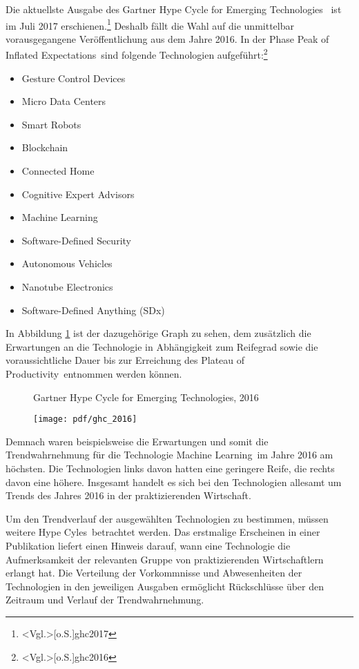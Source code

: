 Die aktuellste Ausgabe des \glqq Gartner Hype Cycle for Emerging Technologies\grqq~ ist im Juli 2017 erschienen.\footnote{\citeNP<Vgl.>[o.S.]{ghc2017}} Deshalb fällt die Wahl auf die unmittelbar vorausgegangene Veröffentlichung aus dem Jahre 2016. In der Phase \glqq Peak of Inflated Expecta\-tions\grqq~sind folgende Technologien aufgeführt:\footnote{\citeNP<Vgl.>[o.S.]{ghc2016}}

\begin{itemize}
	\item Gesture Control Devices
	\item Micro Data Centers
	\item Smart Robots
	\item Blockchain
	\item Connected Home
	\item Cognitive Expert Advisors
	\item Machine Learning
	\item Software-Defined Security
	\item Autonomous Vehicles
	\item Nanotube Electronics
	\item Software-Defined Anything (SDx)
\end{itemize}

In Abbildung \ref{fig:ghc2016} ist der dazugehörige Graph zu sehen, dem zusätzlich die Erwartungen an die Technologie in Abhängigkeit zum Reifegrad sowie die voraussichtliche Dauer bis zur Erreichung des \glqq Plateau of Productivity\grqq~entnommen werden können.

\begin{figure}
	\centering
	\caption{Gartner Hype Cycle for Emerging Technologies, 2016}
	\texttt{[image: pdf/ghc\_2016]}
	\caption*{\protect\citeNP<Quelle:>[o.S.]{ghcet2016}}
	\label{fig:ghc2016}
\end{figure}

Demnach waren beispielsweise die Erwartungen und somit die Trendwahrnehmung für die Technologie \glqq Machine Learning\grqq~im Jahre 2016 am höchsten. Die Technologien links davon hatten eine geringere Reife, die rechts davon eine höhere. Insgesamt handelt es sich bei den Technologien allesamt um Trends des Jahres 2016 in der praktizierenden Wirtschaft.

Um den Trendverlauf der ausgewählten Technologien zu bestimmen, müssen weitere \glqq Hype Cyles\grqq~betrachtet werden. Das erstmalige Erscheinen in einer Publikation liefert einen Hinweis darauf, wann eine Technologie die Aufmerksamkeit der relevanten Gruppe von praktizierenden Wirtschaftlern erlangt hat. Die Verteilung der Vorkommnisse und Abwesenheiten der Technologien in den jeweiligen Ausgaben ermöglicht Rückschlüsse über den Zeitraum und Verlauf der Trendwahrnehmung.

